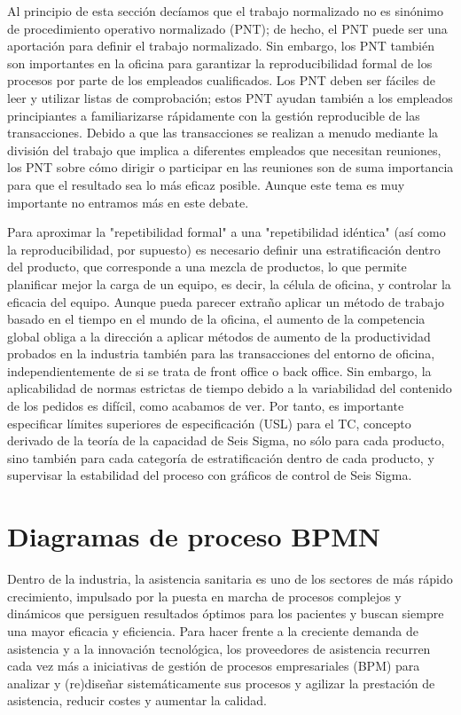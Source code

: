 Al principio de esta sección decíamos que el trabajo normalizado no es sinónimo de procedimiento operativo normalizado (PNT); de hecho, el PNT puede ser una aportación para definir el trabajo normalizado.
Sin embargo, los PNT también son importantes en la oficina para garantizar la reproducibilidad formal de los procesos por parte de los empleados cualificados.
Los PNT deben ser fáciles de leer y utilizar listas de comprobación; estos PNT ayudan también a los empleados principiantes a familiarizarse rápidamente con la gestión reproducible de las transacciones.
Debido a que las transacciones se realizan a menudo mediante la división del trabajo que implica a diferentes empleados que necesitan reuniones, los PNT sobre cómo dirigir o participar en las reuniones son de suma importancia para que el resultado sea lo más eficaz posible.
Aunque este tema es muy importante no entramos más en este debate.

Para aproximar la "repetibilidad formal" a una "repetibilidad idéntica" (así como la reproducibilidad, por supuesto) es necesario definir una estratificación dentro del producto, que corresponde a una mezcla de productos, lo que permite planificar mejor la carga de un equipo, es decir, la célula de oficina, y controlar la eficacia del equipo.
Aunque pueda parecer extraño aplicar un método de trabajo basado en el tiempo en el mundo de la oficina, el aumento de la competencia global obliga a la dirección a aplicar métodos de aumento de la productividad probados en la industria también para las transacciones del entorno de oficina, independientemente de si se trata de front office o back office.
Sin embargo, la aplicabilidad de normas estrictas de tiempo debido a la variabilidad del contenido de los pedidos es difícil, como acabamos de ver.
Por tanto, es importante especificar límites superiores de especificación (USL) para el TC, concepto derivado de la teoría de la capacidad de Seis Sigma, no sólo para cada producto, sino también para cada categoría de estratificación dentro de cada producto, y supervisar la estabilidad del proceso con gráficos de control de Seis Sigma.

\section{Diagramas de proceso BPMN}

Dentro de la industria, la asistencia sanitaria es uno de los sectores de más rápido crecimiento, impulsado por la puesta en marcha de procesos complejos y dinámicos que persiguen resultados óptimos para los pacientes y buscan siempre una mayor eficacia y eficiencia.
Para hacer frente a la creciente demanda de asistencia y a la innovación tecnológica, los proveedores de asistencia recurren cada vez más a iniciativas de gestión de procesos empresariales (BPM) para analizar y (re)diseñar sistemáticamente sus procesos y agilizar la prestación de asistencia, reducir costes y aumentar la calidad.

